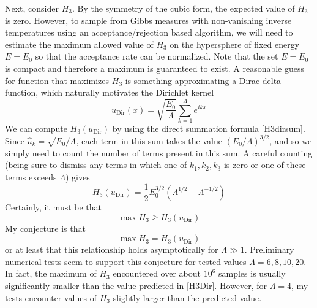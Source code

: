 \documentclass[12pt]{article}
\newcommand{\uhat}{\hat{u}}
\newcommand{\sumk}{\sum_{k=1}^{\Lambda}}
\newcommand{\uDir}{u_{\text{Dir}}}
\begin{document}
Next, consider $H_3$. By the symmetry of the cubic form, the expected value of $H_3$ is zero. However, to sample from Gibbs measures with non-vanishing inverse temperatures using an acceptance/rejection based algorithm, we will need to estimate the maximum allowed value of $H_3$ on the hypersphere of fixed energy $E = E_0$ so that the acceptance rate can be normalized. Note that the set $E=E_0$ is compact and therefore a maximum is guaranteed to exist. A reasonable guess for function that maximizes $H_3$ is something approximating a Dirac delta function, which naturally motivates the Dirichlet kernel
\begin{equation}
\label{Dkern}
\uDir(x) = \sqrt{\frac{E_0}{\Lambda}}\sumk e^{i k x}
\end{equation}
We can compute $H_3(\uDir)$ by using the direct summation formula \eqref{H3dirsum}. Since $\uhat_k = \sqrt{E_0/\Lambda}$, each term in this sum takes the value $(E_0/\Lambda)^{3/2}$, and so we simply need to count the number of terms present in this sum. A careful counting (being sure to dismiss any terms in which one of $k_1, k_2, k_3$ is zero or one of these terms exceeds $\Lambda$) gives
\begin{equation}
\label{H3Dir}
H_3(\uDir) = \frac{1}{2} E_0^{3/2} (\Lambda^{1/2} - \Lambda^{-1/2})
\end{equation}
Certainly, it must be that
\begin{equation}
\max H_3 \ge H_3(\uDir) 
\end{equation}
My conjecture is that
\begin{equation}
\max H_3 = H_3(\uDir) 
\end{equation}
or at least that this relationship holds asymptotically for $\Lambda \gg 1$.
Preliminary numerical tests seem to support this conjecture for tested values $\Lambda = 6, 8, 10, 20$. In fact, the maximum of $H_3$ encountered over about $10^6$ samples is usually significantly smaller than the value predicted in \eqref{H3Dir}. However, for $\Lambda = 4$, my tests encounter values of $H_3$ slightly larger than the predicted value.
\end{document}
